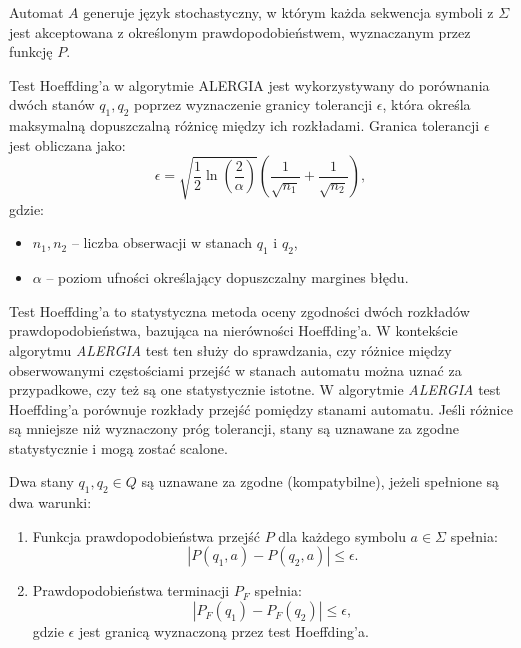 Automat \( A \) generuje język stochastyczny, w którym każda sekwencja symboli z \( \Sigma \) jest akceptowana z określonym prawdopodobieństwem, wyznaczanym przez funkcję \( P \).

\begin{definition}  
\label{def:hoeffding_test}
Test Hoeffding’a w algorytmie ALERGIA jest wykorzystywany do porównania dwóch stanów \( q_1, q_2 \) poprzez wyznaczenie granicy tolerancji \( \epsilon \), która określa maksymalną dopuszczalną różnicę między ich rozkładami. Granica tolerancji \( \epsilon \) jest obliczana jako:  
\[
\epsilon = \sqrt{\frac{1}{2} \ln\left(\frac{2}{\alpha}\right)} \left( \frac{1}{\sqrt{n_1}} + \frac{1}{\sqrt{n_2}} \right),
\]
gdzie:  
\begin{itemize}  
    \item \( n_1, n_2 \) -- liczba obserwacji w stanach \( q_1 \) i \( q_2 \),  
    \item \( \alpha \) -- poziom ufności określający dopuszczalny margines błędu.  
\end{itemize}  
\end{definition}

Test Hoeffding’a to statystyczna metoda oceny zgodności dwóch rozkładów prawdopodobieństwa, bazująca na nierówności Hoeffding’a. W kontekście algorytmu \textit{ALERGIA} test ten służy do sprawdzania, czy różnice między obserwowanymi częstościami przejść w stanach automatu można uznać za przypadkowe, czy też są one statystycznie istotne. W algorytmie \textit{ALERGIA} test Hoeffding’a porównuje rozkłady przejść pomiędzy stanami automatu. Jeśli różnice są mniejsze niż wyznaczony próg tolerancji, stany są uznawane za zgodne statystycznie i mogą zostać scalone. 

\begin{definition}  
\label{def:alergia_state_compatibility}
Dwa stany \( q_1, q_2 \in Q \) są uznawane za zgodne (kompatybilne), jeżeli spełnione są dwa warunki:  
\begin{enumerate}
    \item Funkcja prawdopodobieństwa przejść \( P \) dla każdego symbolu \( a \in \Sigma \) spełnia:  
    \[
    |P(q_1, a) - P(q_2, a)| \leq \epsilon.
    \]  
    \item Prawdopodobieństwa terminacji \( P_F \) spełnia:
    \[
    |P_F(q_1) - P_F(q_2)| \leq \epsilon,
    \]  
    gdzie \( \epsilon \) jest granicą wyznaczoną przez test Hoeffding’a.
\end{enumerate}
\end{definition} 

